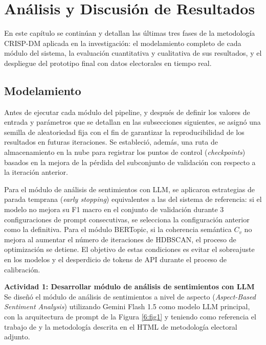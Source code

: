 \chapter{Análisis y Discusión de Resultados}

En este capítulo se continúan y detallan las últimas tres fases de la metodología
CRISP-DM aplicada en la investigación: el modelamiento completo de cada módulo del
sistema, la evaluación cuantitativa y cualitativa de sus resultados, y el despliegue
del prototipo final con datos electorales en tiempo real.

\section{Modelamiento}

Antes de ejecutar cada módulo del pipeline, y después de definir los valores de
entrada y parámetros que se detallan en las subsecciones siguientes, se asignó una
semilla de aleatoriedad fija con el fin de garantizar la reproducibilidad de los
resultados en futuras iteraciones. Se estableció, además, una ruta de almacenamiento
en la nube para registrar los puntos de control (\textit{checkpoints}) basados en la
mejora de la pérdida del subconjunto de validación con respecto a la iteración
anterior.

Para el módulo de análisis de sentimientos con LLM, se aplicaron estrategias de
parada temprana (\textit{early stopping}) equivalentes a las del sistema de referencia:
si el modelo no mejora su F1 macro en el conjunto de validación durante 3 configuraciones
de prompt consecutivas, se selecciona la configuración anterior como la definitiva.
Para el módulo BERTopic, si la coherencia semántica $C_v$ no mejora al aumentar el
número de iteraciones de HDBSCAN, el proceso de optimización se detiene. El objetivo
de estas condiciones es evitar el sobreajuste en los modelos y el desperdicio de tokens
de API durante el proceso de calibración.

\textbf{Actividad 1: Desarrollar módulo de análisis de sentimientos con LLM}
\\
Se diseñó el módulo de análisis de sentimientos a nivel de aspecto (\textit{Aspect-Based
Sentiment Analysis}) utilizando Gemini Flash 1.5 como modelo LLM principal, con la
arquitectura de prompt de la Figura \ref{6:fig1} y teniendo como referencia el trabajo
de \cite{pr_alvarez2023llm_political} y la metodología descrita en el HTML de
metodología electoral adjunto.

